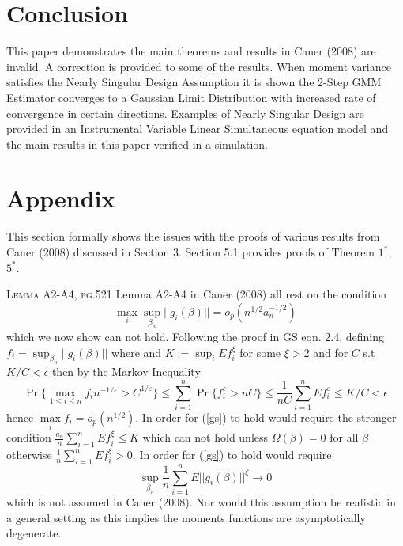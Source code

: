 \documentclass[11pt, fleqn]{article}
\begin{document}
\section{Conclusion}

This paper demonstrates the main theorems and results in Caner (2008) are invalid.
A correction is provided to some of the results.
When moment variance satisfies the Nearly Singular Design Assumption it is shown the 2-Step GMM Estimator converges to a Gaussian Limit Distribution with increased rate of convergence in certain directions. 
Examples of Nearly Singular Design are provided in an Instrumental Variable Linear Simultaneous equation model and the main results in this paper verified in a simulation.


\newpage
\section{Appendix}
This section formally shows the issues with the proofs of various results from Caner (2008) discussed in Section 3. Section 5.1 provides proofs of Theorem $1^*$,  $5^*$.\newline

\textsc{Lemma A2-A4, pg.521}\newline
Lemma A2-A4 in Caner (2008) all rest on the condition
\begin{equation}\label{gs} \max_i \sup_{\beta_n} |\!| g_i(\beta)|\!| =o_p(n^{1/2}a_n^{-1/2}) \end{equation}
which  we now show can not hold.
Following the proof in GS eqn. 2.4, defining $f_i=\sup_{\beta_n} |\!| g_i(\beta) |\!|$  where and $K:=\sup_i Ef_i^{\xi}$ for some $\xi>2$ and for $C$ s.t $K/C<\epsilon$
then by the Markov Inequality
\begin{equation}\label{pll}\Pr\{\underset{1\leq i\leq n}{\max} f_i n^{-1/\varepsilon}>C^{1/\varepsilon}\}
\leq \sum_{i=1}^n \Pr\{f_i^{\varepsilon}>nC\}\leq \frac{1}{nC}\sum_{i=1}^n Ef_i^{\varepsilon}\leq K/C<\epsilon \end{equation}
hence $\underset{i}{\max} f_i=o_p(n^{1/2})$. In order for (\ref{gs}) to hold would require the stronger condition  $\frac{a_n}{n}\sum_{i=1}^nEf_i^{\xi}\leq K$ which can not hold unless $\Omega(\beta)=0$ for all $\beta $ otherwise $\frac{1}{n}\sum_{i=1}^nEf_i^{\xi}>0$. In order for  (\ref{gs})  to hold would require 
\begin{equation}\label{cf1}
\sup_{\beta_n} \frac{1}{n}\sum_{i=1}^nE|\!|g_i(\beta)|\!|^{\xi} \rightarrow 0
\end{equation}
which is  not assumed in Caner (2008). Nor would this assumption be realistic in a general setting as this  implies  the moments functions are asymptotically degenerate. 
\end{document}
